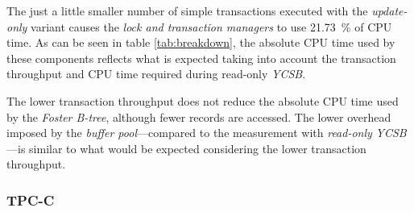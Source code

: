     The just a little smaller number of simple transactions executed with the \emph{update-only} variant causes the \emph{lock and transaction managers} to use \SI{21.73}{\percent} of CPU time. As can be seen in table \ref{tab:breakdown}, the absolute CPU time used by these components reflects what is expected taking into account the transaction throughput and CPU time required during read-only \textit{YCSB}.

    The lower transaction throughput does not reduce the absolute CPU time used by the \emph{Foster B-tree}, although fewer records are accessed. The lower overhead imposed by the \emph{buffer pool}---compared to the measurement with \emph{read-only} \textit{YCSB}---is similar to what would be expected considering the lower transaction throughput.

\subsubsection{TPC-C} \label{subsubsec:looking_glass_single_threaded_tpcc}

